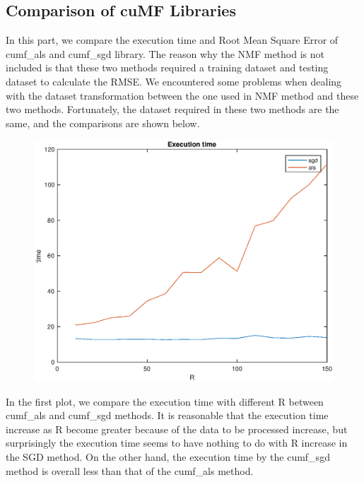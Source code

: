 \documentclass[12pt]{article}
\theoremstyle{remark}
\begin{document}
\begin{CJK}{UTF8}{bsmi}
\section{Comparison of cuMF Libraries}
In this part, we compare the execution time and Root Mean Square Error of cumf\_als and cumf\_sgd library.  The reason why the NMF method is not included is that these two methods required a training dataset and testing dataset to calculate the RMSE.  We encountered some problems when dealing with the dataset transformation between the one used in NMF method and these two methods. Fortunately, the dataset required in these two methods are the same, and the comparisons are shown below.
\begin{figure}[H]
    \begin{center}
        \includegraphics[width=500pt]{time.eps}
        \label{fig:arch_02}
    \end{center}
\end{figure}
In the first plot, we compare the execution time with different R between cumf\_als and cumf\_sgd methods.  It is reasonable that the execution time increase as R become greater because of the data to be processed increase, but surprisingly the execution time seems to have nothing to do with R increase in the SGD method. On the other hand, the execution time by the cumf\_sgd method is overall less than that of the cumf\_als method.
\begin{figure}[H]
    \begin{center}

\end{center}
\end{figure}
\end{CJK}
\end{document}
